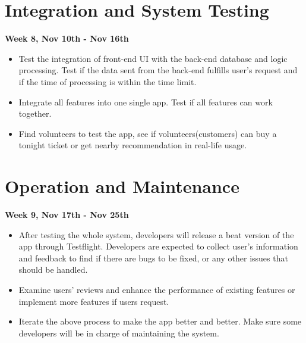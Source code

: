 \documentclass{article}
\begin{document}
	\section{\large Integration and System Testing}
	\hfill \small\textbf{Week 8, Nov 10th - Nov 16th}
	\begin{itemize}
		\item Test the integration of front-end UI with the back-end database and logic processing. Test if the data sent from the back-end fulfills user's request and if the time of processing is within the time limit.
		\item Integrate all features into one single app. Test if all features can work together.
		\item Find volunteers to test the app, see if volunteers(customers) can buy a tonight ticket or get nearby recommendation in real-life usage.
	\end{itemize}
	
	\section{\large Operation and Maintenance}
	\hfill \small\textbf{Week 9, Nov 17th - Nov 25th}
	\begin{itemize}
		\item After testing the whole system, developers will release a beat version of the app through Testflight. Developers are expected to collect user's information and feedback to find if there are bugs to be fixed, or any other issues that should be handled.
		\item Examine users' reviews and enhance the performance of existing features or implement more features if users request. 
		\item Iterate the above process to make the app better and better. Make sure some developers will be in charge of maintaining the system.
	\end{itemize}
	
\end{document}
